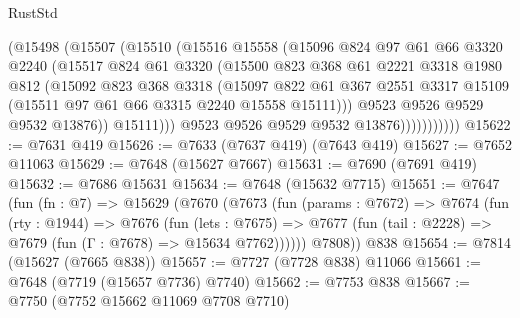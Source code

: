 \begin{lexlean}{RustStd}
\begin{coremodule}
{\begin{coremodule}
{{{{{{{{{{{{{{{{{{{{{{{{{{{{{{{{{{{{{{{{{{{{{{{{{{{{{                      (@15498
                        (@15507
                          (@15510
                            (@15516
                              @15558
                              (@15096
                                @824
                                @97
                                @61
                                @66
                                @3320
                                @2240
                                (@15517
                                  @824
                                  @61
                                  @3320
                                  (@15500
                                    @823
                                    @368
                                    @61
                                    @2221
                                    @3318
                                    @1980
                                    @812
                                    (@15092
                                      @823
                                      @368
                                      @3318
                                      (@15097
                                        @822
                                        @61
                                        @367
                                        @2551
                                        @3317
                                        @15109
                                        (@15511 @97 @61 @66 @3315 @2240 @15558 @15111)))
                                    @9523
                                    @9526
                                    @9529
                                    @9532
                                    @13876))
                                @15111)))
                          @9523
                          @9526
                          @9529
                          @9532
                          @13876)))))))))))
@15622 := @7631 @419
@15626 := @7633 (@7637 @419) (@7643 @419)
@15627 := @7652 @11063
@15629 := @7648 (@15627 @7667)
@15631 := @7690 (@7691 @419)
@15632 := @7686 @15631
@15634 := @7648 (@15632 @7715)
@15651 := @7647
    (fun (fn : @7) =>
    @15629
      (@7670
        (@7673
          (fun (params : @7672) =>
          @7674
            (fun (rty : @1944) =>
            @7676
              (fun (lets : @7675) =>
              @7677 (fun (tail : @2228) => @7679 (fun (Γ : @7678) => @15634 @7762))))))
        @7808))
    @838
@15654 := @7814 (@15627 (@7665 @838))
@15657 := @7727 (@7728 @838) @11066
@15661 := @7648 (@7719 (@15657 @7736) @7740)
@15662 := @7753 @838
@15667 := @7750 (@7752 @15662 @11069 @7708 @7710)
}}}}}}}}}}}}}}}}}}}}}}}}}}}}}}}}}}}}}}}}}}}}}}}}}}}}}
\end{coremodule}}
\end{coremodule}
\end{lexlean}
